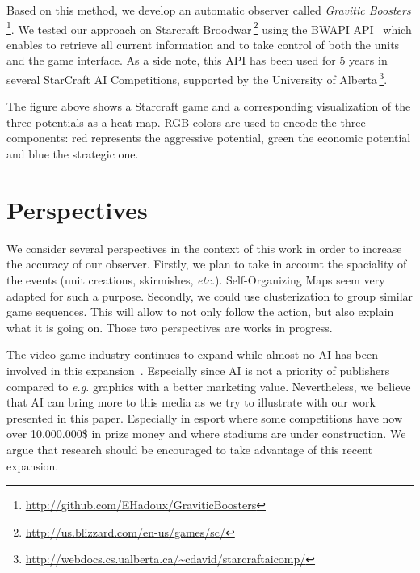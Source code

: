 \documentclass{jfsma}
\begin{document}
Based on this method, we develop an automatic observer called \emph{Gravitic Boosters}\,\footnote{\url{http://github.com/EHadoux/GraviticBoosters}}.
We tested our approach on Starcraft Broodwar\,\footnote{\url{http://us.blizzard.com/en-us/games/sc/}} using
the BWAPI API~\cite{bwapi} which enables to retrieve all current information and to take control of both the units and the game interface.
As a side note, this API has been used for 5 years in several StarCraft AI Competitions, supported by the University of Alberta\,\footnote{\url{http://webdocs.cs.ualberta.ca/~cdavid/starcraftaicomp/}}.

The figure above shows a Starcraft game and a corresponding visualization of the three potentials as a heat map. 
RGB colors are used to encode the three components: red represents the aggressive potential, green the economic potential and blue the strategic one.

\section{Perspectives}
We consider several perspectives in the context of this work in order to increase the accuracy of our observer.
Firstly, we plan to take in account the spaciality of the events (unit creations, skirmishes, \emph{etc.}).
Self-Organizing Maps seem very adapted for such a purpose.
Secondly, we could use clusterization to group similar game sequences.
This will allow to not only follow the action, but also explain what it is going on.
Those two perspectives are works in progress.

The video game industry continues to expand while almost no AI has been involved in this expansion~\cite{miikkulainen2007creating}. Especially since AI is not a priority of publishers compared to \textit{e.g.} graphics with a better marketing value. Nevertheless, we believe that AI can bring more to this media as we try to illustrate with our work presented in this paper. Especially in esport where some competitions have now over 10.000.000\$ in prize money and where stadiums are under construction.
We argue that research should be encouraged to take advantage of this recent expansion.



\end{document}
